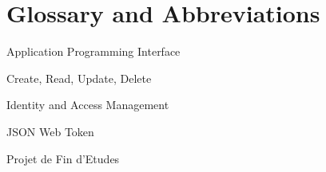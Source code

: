 \chapter*{Glossary and Abbreviations}

\begin{abbrv}
	\item[API] Application Programming Interface
	\item[CRUD] Create, Read, Update, Delete
	\item[IAM] Identity and Access Management
	\item[JWT] JSON Web Token
	\item[PFE] Projet de Fin d'Etudes
\end{abbrv}
